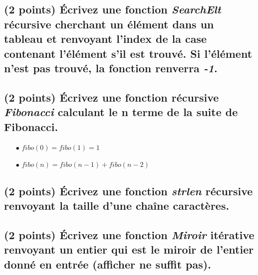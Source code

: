\documentclass[11pt,a4paper]{article}
\begin{document}
\bigskip

\begin{center}
\end{center}

\bigskip

\subsection{(2 points) \'Ecrivez une fonction \og \textit{SearchElt} \fg{} récursive cherchant un élément dans un tableau et renvoyant l'index de la case contenant l'élément s'il est trouvé. Si l'élément n'est pas trouvé, la fonction renverra \textit{-1}. }

\bigskip

\begin{center}
\end{center}

\bigskip

\subsection{(2 points) \'Ecrivez une fonction récursive \og \textit{Fibonacci} \fg{} calculant le n terme de la suite de Fibonacci. }

\begin{itemize}
\item[$\bullet$] $ fibo(0) = fibo(1) = 1 $
\item[$\bullet$] $ fibo(n) = fibo(n - 1) + fibo(n - 2) $
\end{itemize}

\bigskip

\begin{center}
\end{center}

\bigskip

\subsection{(2 points) \'Ecrivez une fonction \og \textit{strlen} \fg{} récursive renvoyant la taille d'une chaîne caractères. }

\bigskip

\begin{center}
\end{center}

\bigskip

\subsection{(2 points) \'Ecrivez une fonction \og \textit{Miroir} \fg{} itérative renvoyant un entier qui est le miroir de l'entier donné en entrée (afficher ne suffit pas). }
\end{document}
